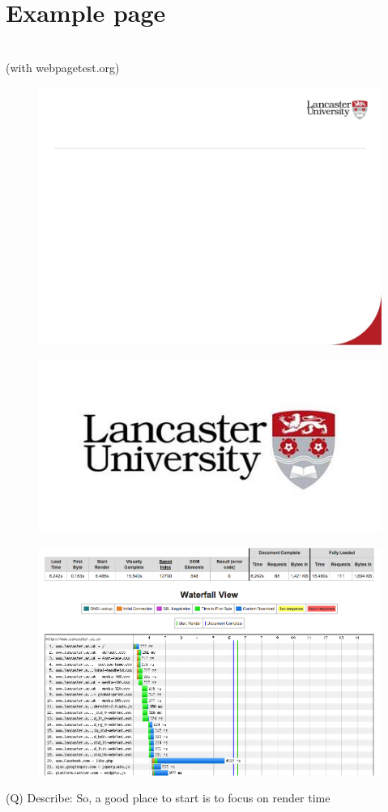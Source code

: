 \documentclass[12pt]{article}
\begin{document}
\section{Example page}
\\
(with webpagetest.org)\\
\begin{figure}[H]
\includegraphics[width=0.5\linewidth]{page43-image-1.png}
\end{figure}
\begin{figure}[H]
\includegraphics[width=0.5\linewidth]{page43-image-2.png}
\end{figure}
\begin{figure}[H]
\includegraphics[width=0.5\linewidth]{page43-image-3.png}
\end{figure}
\clearpage
(Q)
Describe: So, a good place to start is to focus on render time
\clearpage
\end{document}
